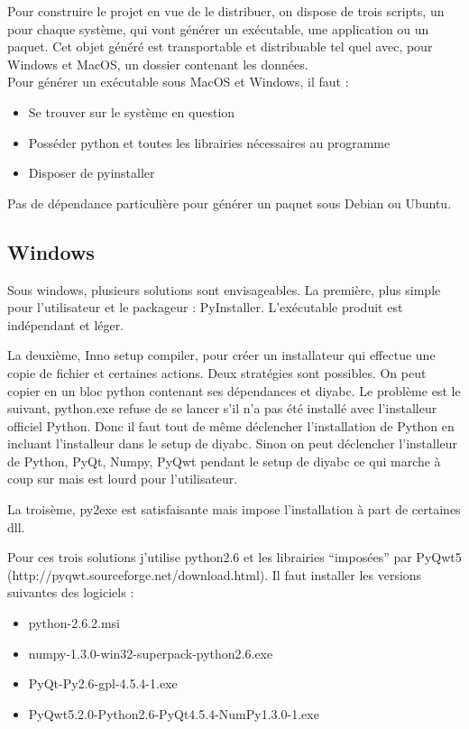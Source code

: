 \documentclass[12pt,a4paper]{article}
\begin{document}
    Pour construire le projet en vue de le distribuer, on dispose de trois scripts, un pour chaque système, qui vont 
    générer un exécutable, une application ou un paquet. Cet objet généré est transportable et distribuable tel quel avec,
    pour Windows et MacOS, un dossier contenant les données.\\

    Pour générer un exécutable sous MacOS et Windows, il faut : 
    \begin{itemize}
    \item Se trouver sur le système en question
    \item Posséder python et toutes les librairies nécessaires au programme
    \item Disposer de pyinstaller\\
    \end{itemize}

    Pas de dépendance particulière pour générer un paquet sous Debian ou Ubuntu.

    
    \subsection{Windows}
        Sous windows, plusieurs solutions sont envisageables. La première, plus simple pour l'utilisateur et le
        packageur : PyInstaller. L'ex\'ecutable produit est ind\'ependant et l\'eger. \newline

        La deuxième, Inno setup compiler, pour cr\'eer un installateur qui effectue une copie de fichier et certaines actions.
        Deux strat\'egies sont possibles. On peut copier en un bloc
        python contenant ses d\'ependances et diyabc. Le problème est le suivant, python.exe refuse de se lancer s'il n'a pas \'et\'e
        install\'e avec l'installeur officiel Python. Donc il faut tout de même d\'eclencher l'installation de Python en incluant
        l'installeur dans le setup de diyabc. Sinon on peut d\'eclencher l'installeur de Python, PyQt, Numpy, PyQwt pendant le setup de
        diyabc ce qui marche à coup sur mais est lourd pour l'utilisateur.\newline
        
        La troisème, py2exe est satisfaisante mais impose l'installation à part de certaines dll.\newline

        Pour ces trois solutions j'utilise python2.6 et les librairies ``impos\'ees'' par PyQwt5 (http://pyqwt.sourceforge.net/download.html).
        Il faut installer les versions suivantes des logiciels :
        \begin{itemize}
            \item python-2.6.2.msi
            \item numpy-1.3.0-win32-superpack-python2.6.exe
            \item PyQt-Py2.6-gpl-4.5.4-1.exe
            \item PyQwt5.2.0-Python2.6-PyQt4.5.4-NumPy1.3.0-1.exe
        \end{itemize}
\end{document}

